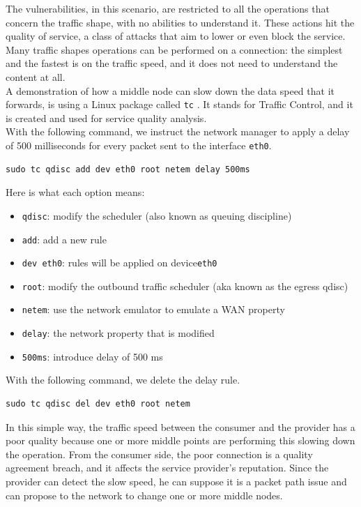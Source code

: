 \documentclass[12pt]{article}
\begin{document}
	The vulnerabilities, in this scenario, are restricted to all the operations that concern the traffic shape, with no abilities to understand it. These actions hit the quality of service, a class of attacks that aim to lower or even block the service.\\
	Many traffic shapes operations can be performed on a connection: the simplest and the fastest is on the traffic speed, and it does not need to understand the content at all.\\
	\bigbreak
	A demonstration of how a middle node can slow down the data speed that it forwards, is using a Linux package called \lstinline{tc} \cite{tc}. It stands for Traffic Control, and it is created and used for service quality analysis.\\
	With the following command, we instruct the network manager to apply a delay of 500 milliseconds for every packet sent to the interface \lstinline{eth0}.\\
	
	\begin{lstlisting}[frame=single]
		sudo tc qdisc add dev eth0 root netem delay 500ms
	\end{lstlisting}
	
	Here is what each option means:
	\begin{itemize}
		\item \lstinline{qdisc}: modify the scheduler (also known as queuing discipline)
		\item \lstinline{add}: add a new rule
		\item \lstinline{dev eth0}: rules will be applied on device\lstinline{eth0}
		\item \lstinline{root}: modify the outbound traffic scheduler (aka known as the egress qdisc)
		\item \lstinline{netem}: use the network emulator to emulate a WAN property
		\item \lstinline{delay}: the network property that is modified
		\item \lstinline{500ms}: introduce delay of 500 ms
	\end{itemize}

	With the following command, we delete the delay rule.\\

	\begin{lstlisting}[frame=single]
		sudo tc qdisc del dev eth0 root netem
	\end{lstlisting}

	In this simple way, the traffic speed between the consumer and the provider has a poor quality because one or more middle points are performing this slowing down the operation. From the consumer side, the poor connection is a quality agreement breach, and it affects the service provider's reputation. Since the provider can detect the slow speed, he can suppose it is a packet path issue and can propose to the network to change one or more middle nodes. 
\end{document}
